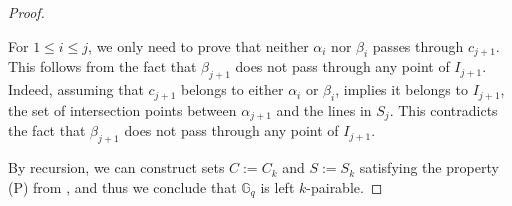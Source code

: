 \documentclass[a4paper,UKenglish,cleveref, autoref, thm-restate]{arxiv}
\newcommand{\ls}{\leqslant}
\newcommand{\G}[1][q]{\mathbb{G}_{#1}}
\begin{document}
\begin{proof}
\begin{enumerate}
        For $1\ls i \ls j$, we only need to prove that neither $\alpha_i$ nor $\beta_i$ passes through $c_{j+1}$. This follows from the fact that $\beta_{j+1}$ does not pass through any point of $I_{j+1}$. Indeed, assuming that $c_{j+1}$  belongs to either $\alpha_i$ or $\beta_i$, implies it belongs to $I_{j+1}$, the set of intersection points between $\alpha_{j+1}$ and the lines in $S_j$. This  contradicts the fact that $\beta_{j+1}$ does not pass through any point of $I_{j+1}$.
    \end{enumerate}

    \noindent By recursion, we can construct sets $C := C_k$ and $S := S_k$ satisfying the property (P) from , and thus we conclude that $\G$ is left $k$-pairable.
\end{proof}
\end{document}

